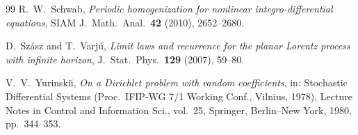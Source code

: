 \documentclass[11pt]{amsart}
\theoremstyle{plain}
\theoremstyle{definition}
\theoremstyle{remark}
\begin{document}
\begin{thebibliography}{99}
		R.~W.~Schwab,
		\emph{Periodic homogenization for nonlinear integro-differential equations},
		SIAM J.\ Math.\ Anal.\ \textbf{42} (2010), 2652--2680.
		
		D.~Sz\'asz and T.~Varj\'u,
		\emph{Limit laws and recurrence for the planar Lorentz process with infinite horizon},
		J.\ Stat.\ Phys.\ \textbf{129} (2007), 59--80.
		
		V.~V.~Yurinski\u{\i},
		\emph{On a Dirichlet problem with random coefficients},
		in: Stochastic Differential Systems (Proc.\ IFIP-WG 7/1 Working Conf., Vilnius, 1978), Lecture Notes in Control and Information Sci., vol.~25, Springer, Berlin--New York, 1980, pp.~344--353.
		
	\end{thebibliography}
	\enlargethispage{6\baselineskip}
\end{document}
